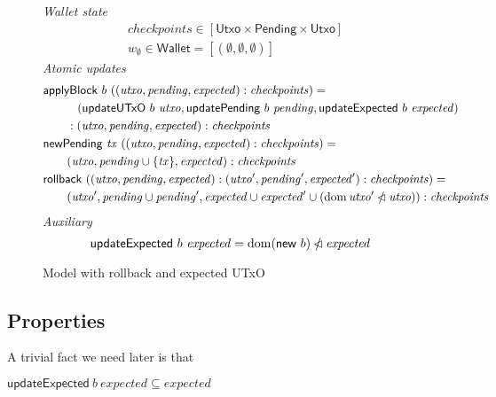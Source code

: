 \documentclass{article}
\newcommand{\restrictdom}{\lhd}
\newcommand{\subtractdom}{\mathbin{\slashed{\restrictdom}}}
\DeclareMathOperator{\dom}{dom}
\theoremstyle{definition}{
  \newtheorem{lemma}{Lemma}[section] %
  \newtheorem{definition}[lemma]{Definition}
}
\theoremstyle{theorem}{
  \newtheorem{invariant}[lemma]{Invariant}
  \newtheorem{proofobligation}[lemma]{Proof Obligation}
}
\numberwithin{equation}{lemma}
\begin{document}
\begin{figure}
%
\emph{Wallet state}
%
\begin{align*}
& \mathit{checkpoints} \in [\mathsf{Utxo} \times \mathsf{Pending} \times \mathsf{Utxo}] \\
& w_\emptyset \in \mathsf{Wallet} = [(\emptyset, \emptyset, \emptyset)]
\end{align*}
%
\emph{Atomic updates}
%
\begin{align*}
& \mathsf{applyBlock} ~ b ~ ((\mathit{utxo}, \mathit{pending}, \mathit{expected}) : \mathit{checkpoints}) = \\
& \qquad \phantom{:{}} ~ (\mathsf{updateUTxO} ~ b ~ \mathit{utxo}, \mathsf{updatePending} ~ b ~ \mathit{pending}, \mathsf{updateExpected} ~ b ~ \mathit{expected}) \\
& \qquad : (\mathit{utxo}, \mathit{pending}, \mathit{expected}) : \mathit{checkpoints} \\
& \mathsf{newPending} ~ \mathit{tx} ~ ((\mathit{utxo}, \mathit{pending}, \mathit{expected}) : \mathit{checkpoints}) = \\
& \qquad (\mathit{utxo}, \mathit{pending} \cup \{\mathit{tx}\}, \mathit{expected}) : \mathit{checkpoints} \\
& \mathsf{rollback} ~ ((\mathit{utxo}, \mathit{pending}, \mathit{expected}) : (\mathit{utxo}', \mathit{pending}', \mathit{expected}') : \mathit{checkpoints}) = \\
& \qquad (\mathit{utxo}', \mathit{pending} \cup \mathit{pending}', \mathit{expected} \cup \mathit{expected}' \cup (\dom \mathit{utxo}' \subtractdom \mathit{utxo})) : \mathit{checkpoints} \\
\end{align*}
%
\emph{Auxiliary}
%
\begin{equation*}
\mathsf{updateExpected} ~ b ~ \mathit{expected} = \dom (\mathsf{new} ~ b) \subtractdom \mathit{expected}
\end{equation*}
%
\caption{\label{fig:model_with_expected_UTxO}Model with rollback and expected UTxO}
\end{figure}

\subsection{Properties}

A trivial fact we need later is that
%
\begin{lemma} \label{lem:updateExpected_is_filter}
\begin{math}
\mathsf{updateExpected} ~ b ~ \mathit{expected} \subseteq \mathit{expected}
\end{math}
\end{lemma}
\end{document}
